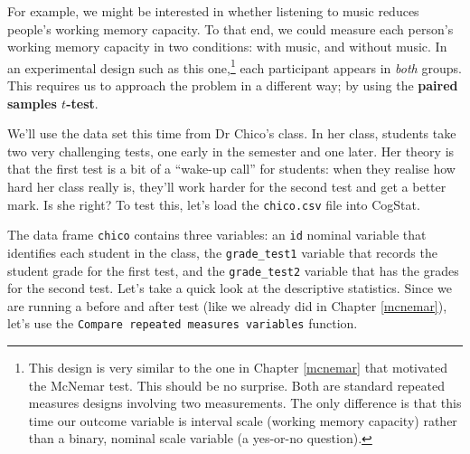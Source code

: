 \documentclass[
]{book}
\theoremstyle{definition}
\theoremstyle{definition}
\theoremstyle{definition}
\theoremstyle{definition}
\theoremstyle{remark}
\begin{document}
For example, we might be interested in whether listening to music reduces people's working memory capacity. To that end, we could measure each person's working memory capacity in two conditions: with music, and without music. In an experimental design such as this one,\footnote{This design is very similar to the one in Chapter \ref{mcnemar} that motivated the McNemar test. This should be no surprise. Both are standard repeated measures designs involving two measurements. The only difference is that this time our outcome variable is interval scale (working memory capacity) rather than a binary, nominal scale variable (a yes-or-no question).} each participant appears in \emph{both} groups. This requires us to approach the problem in a different way; by using the \textbf{paired samples \(t\)-test}.

We'll use the data set this time from Dr Chico's class. In her class, students take two very challenging tests, one early in the semester and one later. Her theory is that the first test is a bit of a ``wake-up call'' for students: when they realise how hard her class really is, they'll work harder for the second test and get a better mark. Is she right? To test this, let's load the \texttt{chico.csv} file into CogStat.

The data frame \texttt{chico} contains three variables: an \texttt{id} nominal variable that identifies each student in the class, the \texttt{grade\_test1} variable that records the student grade for the first test, and the \texttt{grade\_test2} variable that has the grades for the second test. Let's take a quick look at the descriptive statistics. Since we are running a before and after test (like we already did in Chapter \ref{mcnemar}), let's use the \texttt{Compare\ repeated\ measures\ variables} function.
\end{document}

